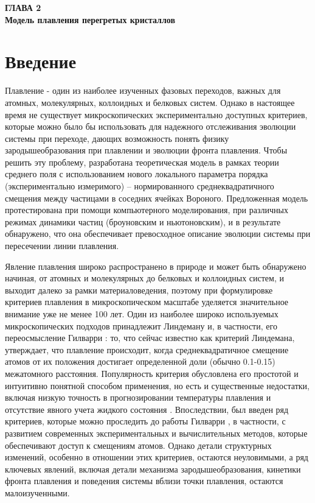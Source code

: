 
\newpage
\begin{center}
\textbf{\large ГЛАВА 2 \\ Модель плавления перегретых кристаллов}
\end{center}


\section{Введение}

Плавление - один из наиболее изученных фазовых переходов, важных для атомных, молекулярных, коллоидных и белковых систем.
Однако в настоящее время не существует микроскопических экспериментально доступных критериев, которые можно было бы использовать для надежного отслеживания эволюции системы при переходе, дающих возможность  понять физику зародышеобразования при плавлении и эволюции фронта плавления.
Чтобы решить эту проблему, разработана теоретическая модель в рамках теории среднего поля с использованием нового локального параметра порядка (экспериментально измеримого) -- нормированного среднеквадратичного смещения между частицами в соседних ячейках Вороного.
Предложенная модель протестирована при помощи компьютерного моделирования, при различных режимах динамики частиц (броуновским и ньютоновским), и в результате обнаружено, что она обеспечивает превосходное описание эволюции системы при пересечении линии плавления.

Явление плавления широко распространено в природе и может быть обнаружено начиная, от атомных и молекулярных до белковых и коллоидных систем, и выходит далеко за рамки материаловедения, поэтому при формулировке критериев плавления в микроскопическом масштабе уделяется значительное внимание уже не менее 100 лет.
Один из наиболее широко используемых микроскопических подходов принадлежит Линдеману \cite{lindemann1910} и, в частности, его переосмысление Гилварри \cite{10.1103/physrev.102.308}: то, что сейчас известно как критерий Линдемана, утверждает, что плавление происходит, когда среднеквадратичное смещение атомов от их положения достигает определенной доли (обычно 0.1-0.15) межатомного расстояния.
Популярность критерия обусловлена его простотой и интуитивно понятной способом применения, но есть и существенные недостатки, включая низкую точность в прогнозировании температуры плавления и отсутствие явного учета жидкого состояния \cite{10.1098/rspa.1991.0068}.
Впоследствии, был введен ряд критериев, которые можно проследить до работы Гилварри \cite{10.1063/1.1426419}, в частности, с развитием современных экспериментальных и вычислительных методов, которые обеспечивают доступ к смещениям атомов.
Однако детали структурных изменений, особенно в отношении этих критериев, остаются неуловимыми, а ряд ключевых явлений, включая детали механизма зародышеобразования, кинетики фронта плавления и поведения системы вблизи точки плавления, остаются малоизученными.


